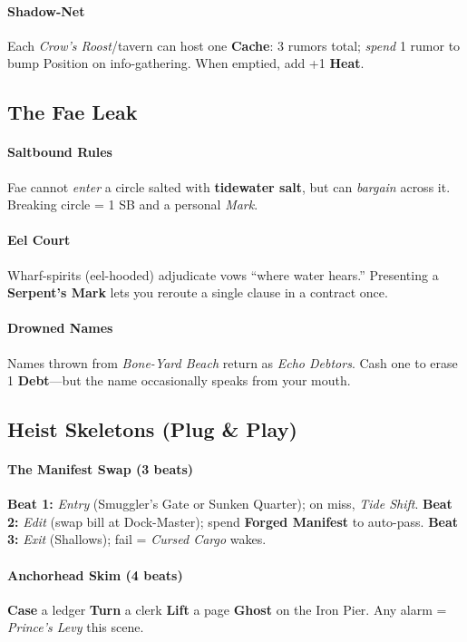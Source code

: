 \paragraph{Shadow-Net}
Each \emph{Crow’s Roost}/tavern can host one \textbf{Cache}: 3 rumors total; \emph{spend} 1 rumor to bump Position on info-gathering. When emptied, add +1 \textbf{Heat}.

\subsection*{The Fae Leak}

\paragraph{Saltbound Rules}
Fae cannot \emph{enter} a circle salted with \textbf{tidewater salt}, but can \emph{bargain} across it. Breaking circle = 1 SB and a personal \emph{Mark}.

\paragraph{Eel Court}
Wharf-spirits (eel-hooded) adjudicate vows “where water hears.” Presenting a \textbf{Serpent’s Mark} lets you reroute a single clause in a contract once.

\paragraph{Drowned Names}
Names thrown from \emph{Bone-Yard Beach} return as \emph{Echo Debtors}. Cash one to erase 1 \textbf{Debt}—but the name occasionally speaks from your mouth.

\subsection*{Heist Skeletons (Plug \& Play)}

\paragraph{The Manifest Swap (3 beats)}
\textbf{Beat 1:} \emph{Entry} (Smuggler’s Gate or Sunken Quarter); on miss, \emph{Tide Shift}.  
\textbf{Beat 2:} \emph{Edit} (swap bill at Dock-Master); spend \textbf{Forged Manifest} to auto-pass.  
\textbf{Beat 3:} \emph{Exit} (Shallows); fail = \emph{Cursed Cargo} wakes.

\paragraph{Anchorhead Skim (4 beats)}
\textbf{Case} a ledger \textrightarrow{} \textbf{Turn} a clerk \textrightarrow{} \textbf{Lift} a page \textrightarrow{} \textbf{Ghost} on the Iron Pier. Any alarm = \emph{Prince’s Levy} this scene.

